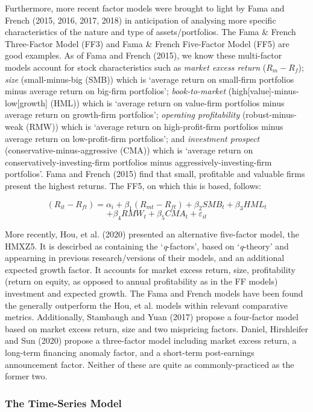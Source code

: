 \documentclass[11pt, english]{article}
\begin{document}
	Furthermore, more recent factor models were brought to light by Fama and French (2015, 2016, 2017, 2018) in anticipation of analysing more specific characteristics of the nature and type of assets/portfolios. The Fama \& French Three-Factor Model (FF3) and Fama \& French Five-Factor Model (FF5) are good examples. As of Fama and French (2015), we know these multi-factor models account for stock characteristics such as \textit{market excess return} ($R_m-R_f$); \textit{size} (small-minus-big (SMB)) which is `average return on small-firm portfolios minus average return on big-firm portfolios'; \textit{book-to-market} (high[value]-minus-low[growth] (HML)) which is `average return on value-firm portfolios minus average return on growth-firm portfolios'; \textit{operating profitability} (robust-minus-weak (RMW)) which is `average return on high-profit-firm portfolios minus average return on low-profit-firm portfolios'; and \textit{investment prospect} (conservative-minus-aggressive (CMA)) which is `average return on conservatively-investing-firm portfolios minus aggressively-investing-firm portfolios'. Fama and French (2015) find that small, profitable and valuable firms present the highest returns. The FF5, on which this is based, follows:

        $$(R_{it}-R_{ft})=\alpha_i+\beta_1(R_{mt}-R_{ft})+\beta_2SMB_t+\beta_3HML_t$$
        $$+\beta_4RMW_t+\beta_5CMA_t+\varepsilon_{it}$$

	More recently, Hou, et al. (2020) presented an alternative five-factor model, the HMXZ5. It is descirbed as containing the `\textit{q}-factors', based on `\textit{q}-theory' and appearning in previous research/versions of their models, and an additional expected growth factor. It accounts for market excess return, size, profitability (return on equity, as opposed to annual profitability as in the FF models) investment and expected growth. The Fama and French models have been found the generally outperform the Hou, et al. models within relevant comparative metrics. Additionally, Stambaugh and Yuan (2017) propose a four-factor model based on market excess return, size and two mispricing factors. Daniel, Hirshleifer and Sun (2020) propose a three-factor model including market excess return, a long-term financing anomaly factor, and a short-term post-earnings announcement factor. Neither of these are quite as commonly-practiced as the former two.

                \subsubsection*{The Time-Series Model}
\end{document}
